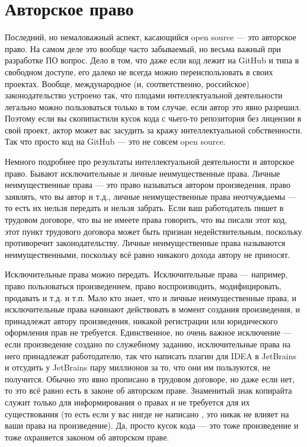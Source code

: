 \documentclass{../../text-style}
\begin{document}
\section{Авторское право}

Последний, но немаловажный аспект, касающийся open source --- это авторское право. На самом деле это вообще часто забываемый, но весьма важный при разработке ПО вопрос. Дело в том, что даже если код лежит на GitHub и типа в свободном доступе, его далеко не всегда можно переиспользовать в своих проектах. Вообще, международное (и, соответственно, российское) законодательство устроено так, что плодами интеллектуальной деятельности легально можно пользоваться только в том случае, если автор это явно разрешил. Поэтому если вы скопипастили кусок кода с чьего-то репозитория без лицензии в свой проект, актор может вас засудить за кражу интеллектуальной собственности. Так что просто код на GitHub --- это не совсем open source.

Немного подробнее про результаты интеллектуальной деятельности и авторское право. Бывают исключительные и личные неимущественные права. Личные неимущественные права --- это право называться автором произведения, право заявлять, что вы автор и т.д., личные неимущественные права неотчуждаемы --- то есть их нельзя передать и нельзя забрать. Если ваш работодатель пишет в трудовом договоре, что вы не имеете права говорить, что вы писали этот код, этот пункт трудового договора может быть признан недействительным, поскольку противоречит законодательству. Личные неимущественные права называются неимущественными, поскольку всё равно никакого дохода автору не приносят.

Исключительные права можно передать. Исключительные права --- например, право пользоваться произведением, право воспроизводить, модифицировать, продавать и т.д. и т.п. Мало кто знает, что и личные неимущественные права, и исключительные права начинают действовать в момент создания произведения, и принадлежат автору произведения, никакой регистрации или юридического оформления прав не требуется. Единственное, но очень важное исключение --- если произведение создано по служебному заданию, исключительные права на него принадлежат работодателю, так что написать плагин для IDEA в JetBrains и отсудить у JetBrains пару миллионов за то, что они им пользуются, не получится. Обычно это явно прописано в трудовом договоре, но даже если нет, то это всё равно есть в законе об авторском праве. Знаменитый знак копирайта \textcopyright служит только для информирования о правах и не требуется для их существования (то есть если у вас нигде не написано \textcopyright, это никак не влияет на ваши права на произведение). Да, просто кусок кода --- это тоже произведение и тоже охраняется законом об авторском праве.
\end{document}
